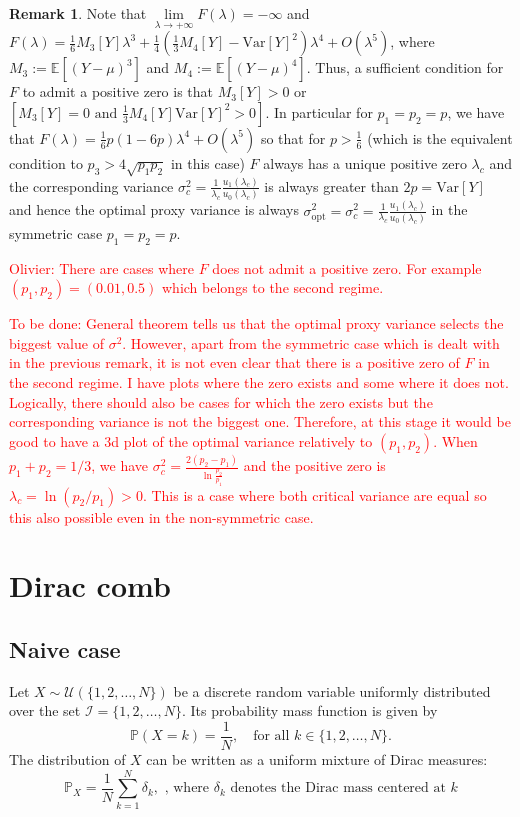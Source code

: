 \documentclass[a4paper, 10pt]{article}
\theoremstyle{definition}
\newtheorem{remark}{Remark}[section]
\begin{document}
\begin{remark}Note that $\underset{\lambda\to +\infty}{\lim} F(\lambda)=-\infty$ and $F(\lambda)=\frac{1}{6}M_3[Y]\lambda^3+\frac{1}{4}\left(\frac{1}{3}M_4[Y]-\text{Var}[Y]^2\right)\lambda^4+ O(\lambda^5)$, where $M_3:=\mathbb{E}[(Y-\mu)^3]$ and $M_4:=\mathbb{E}[(Y-\mu)^4]$. Thus, a sufficient condition for $F$ to admit a positive zero is that $M_3[Y]>0$ or $\left[M_3[Y]=0 \text{ and } \frac{1}{3}M_4[Y]\text{Var}[Y]^2>0\right]$. In particular for $p_1=p_2=p$, we have that $F(\lambda)=\frac{1}{6}p(1-6p)\lambda^4+O(\lambda^5)$ so that for $p>\frac{1}{6}$ (which is the equivalent condition to $p_3>4\sqrt{p_1p_2}$ in this case) $F$ always has a unique positive zero $\lambda_c$ and the corresponding variance $\sigma_c^2=\frac{1}{\lambda_c}\frac{u_1(\lambda_c)}{u_0(\lambda_c)}$ is always greater than $2p=\text{Var}[Y]$ and hence the optimal proxy variance is always $\sigma_{\text{opt}}^2=\sigma_c^2=\frac{1}{\lambda_c}\frac{u_1(\lambda_c)}{u_0(\lambda_c)}$ in the symmetric case $p_1=p_2=p$.
\end{remark}


\textcolor{red}{Olivier: There are cases where $F$ does not admit a positive zero. For example $(p_1,p_2)=(0.01, 0.5)$ which belongs to the second regime. }

\medskip

\textcolor{red}{To be done: General theorem tells us that the optimal proxy variance selects the biggest value of $\sigma^2$. However, apart from the symmetric case which is dealt with in the previous remark, it is not even clear that there is a positive zero of $F$ in the second regime. I have plots where the zero exists and some where it does not. Logically, there should also be cases for which the zero exists but the corresponding variance is not the biggest one. Therefore, at this stage it would be good to have a 3d plot of the optimal variance relatively to $(p_1,p_2)$. When $p_1+p_2=1/3$, we have $\sigma_c^2=\frac{2(p_2-p_1)}{\ln \frac{p_2}{p_1}}$ and the positive zero is $\lambda_c=\ln(p_2/p_1)>0$. This is a case where both critical variance are equal so this also possible even in the non-symmetric case.}

\newpage
\section{Dirac comb}
\subsection{Naive case}
Let \( X \sim \mathcal{U}(\{1, 2, \dots, N\}) \) be a discrete random variable uniformly distributed over the set $ \mathcal{I} = \{1, 2, \dots, N\}$. Its probability mass function is given by
\[
\mathbb{P}(X = k) = \frac{1}{N}, \quad \text{for all } k \in \{1, 2, \dots, N\}.
\]
The distribution of \( X \) can be written as a uniform mixture of Dirac measures:
\[
\mathbb{P}_X = \frac{1}{N} \sum_{k=1}^N \delta_k, \text{ ,  where   } \delta_{k} \text{  denotes the Dirac mass centered at } k
\]
\end{document}
